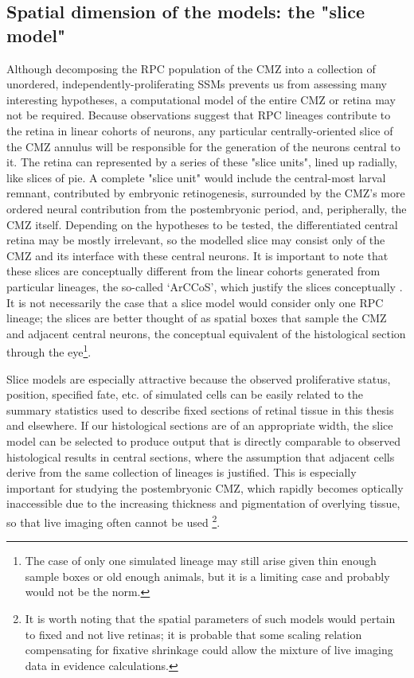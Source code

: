 \subsection{Spatial dimension of the models: the "slice model"}
\label{ssec:slice}
Although decomposing the RPC population of the CMZ into a collection of unordered, independently-proliferating SSMs prevents us from assessing many interesting hypotheses, a computational model of the entire CMZ or retina may not be required. Because observations suggest that RPC lineages contribute to the retina in linear cohorts of neurons, any particular centrally-oriented slice of the CMZ annulus will be responsible for the generation of the neurons central to it. The retina can represented by a series of these "slice units", lined up radially, like slices of pie. A complete "slice unit" would include the central-most larval remnant, contributed by embryonic retinogenesis, surrounded by the CMZ's more ordered neural contribution from the postembryonic period, and, peripherally, the CMZ itself. Depending on the hypotheses to be tested, the differentiated central retina may be mostly irrelevant, so the modelled slice may consist only of the CMZ and its interface with these central neurons. It is important to note that these slices are conceptually different from the linear cohorts generated from particular lineages, the so-called `ArCCoS', which justify the slices conceptually \cite{Centanin2011}. It is not necessarily the case that a slice model would consider only one RPC lineage; the slices are better thought of as spatial boxes that sample the CMZ and adjacent central neurons, the conceptual equivalent of the histological section through the eye\footnote{The case of only one simulated lineage may still arise given thin enough sample boxes or old enough animals, but it is a limiting case and probably would not be the norm.}.

Slice models are especially attractive because the observed proliferative status, position, specified fate, etc. of simulated cells can be easily related to the summary statistics used to describe fixed sections of retinal tissue in this thesis and elsewhere. If our histological sections are of an appropriate width, the slice model can be selected to produce output that is directly comparable to observed histological results in central sections, where the assumption that adjacent cells derive from the same collection of lineages is justified. This is especially important for studying the postembryonic CMZ, which rapidly becomes optically inaccessible due to the increasing thickness and pigmentation of overlying tissue, so that live imaging often cannot be used \footnote{It is worth noting that the spatial parameters of such models would pertain to fixed and not live retinas; it is probable that some scaling relation compensating for fixative shrinkage could allow the mixture of live imaging data in evidence calculations.}.

